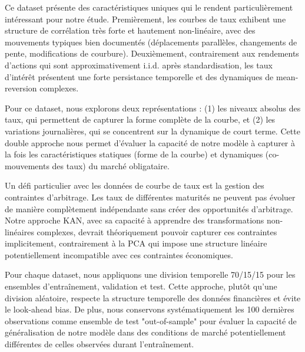 Ce dataset présente des caractéristiques uniques qui le rendent particulièrement intéressant pour notre étude. Premièrement, les courbes de taux exhibent une structure de corrélation très forte et hautement non-linéaire, avec des mouvements typiques bien documentés (déplacements parallèles, changements de pente, modifications de courbure). Deuxièmement, contrairement aux rendements d'actions qui sont approximativement i.i.d. après standardisation, les taux d'intérêt présentent une forte persistance temporelle et des dynamiques de mean-reversion complexes.

Pour ce dataset, nous explorons deux représentations : (1) les niveaux absolus des taux, qui permettent de capturer la forme complète de la courbe, et (2) les variations journalières, qui se concentrent sur la dynamique de court terme. Cette double approche nous permet d'évaluer la capacité de notre modèle à capturer à la fois les caractéristiques statiques (forme de la courbe) et dynamiques (co-mouvements des taux) du marché obligataire.

Un défi particulier avec les données de courbe de taux est la gestion des contraintes d'arbitrage. Les taux de différentes maturités ne peuvent pas évoluer de manière complètement indépendante sans créer des opportunités d'arbitrage. Notre approche KAN, avec sa capacité à apprendre des transformations non-linéaires complexes, devrait théoriquement pouvoir capturer ces contraintes implicitement, contrairement à la PCA qui impose une structure linéaire potentiellement incompatible avec ces contraintes économiques.

Pour chaque dataset, nous appliquons une division temporelle 70/15/15 pour les ensembles d'entraînement, validation et test. Cette approche, plutôt qu'une division aléatoire, respecte la structure temporelle des données financières et évite le look-ahead bias. De plus, nous conservons systématiquement les 100 dernières observations comme ensemble de test "out-of-sample" pour évaluer la capacité de généralisation de notre modèle dans des conditions de marché potentiellement différentes de celles observées durant l'entraînement.